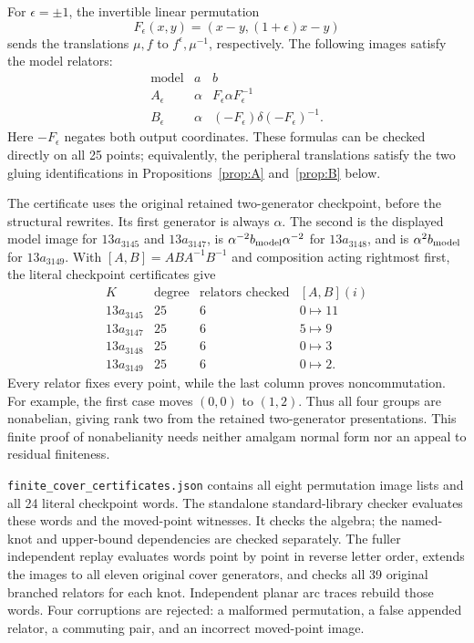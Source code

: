 \documentclass[11pt]{article}
\begin{document}
For $\epsilon=\pm1$, the invertible linear permutation
\[
 F_\epsilon(x,y)=(x-y,(1+\epsilon)x-y)
\]
sends the translations $\mu,f$ to $f^\epsilon,\mu^{-1}$,
respectively. The following images satisfy the model relators:
\[
\begin{array}{c|cc}
 \text{model}&a&b\\\hline
 A_\epsilon&\alpha&F_\epsilon\alpha F_\epsilon^{-1}\\
 B_\epsilon&\alpha&(-F_\epsilon)\delta(-F_\epsilon)^{-1}.
\end{array}
\]
Here $-F_\epsilon$ negates both output coordinates. These formulas
can be checked directly on all 25 points; equivalently, the
peripheral translations satisfy the two gluing identifications
in Propositions~\ref{prop:A} and~\ref{prop:B} below.

The certificate uses the original retained two-generator
checkpoint, before the structural rewrites. Its first generator
is always $\alpha$. The second is the displayed model image
for $13a_{3145}$ and $13a_{3147}$, is
$\alpha^{-2}b_{\rm model}\alpha^{-2}$ for $13a_{3148}$,
and is $\alpha^2b_{\rm model}$ for $13a_{3149}$.
With $[A,B]=ABA^{-1}B^{-1}$ and composition acting rightmost
first, the literal checkpoint certificates give
\[
\begin{array}{c|c|c|c}
 K&\text{degree}&\text{relators checked}&[A,B](i)\\\hline
 13a_{3145}&25&6&0\mapsto11\\
 13a_{3147}&25&6&5\mapsto9\\
 13a_{3148}&25&6&0\mapsto3\\
 13a_{3149}&25&6&0\mapsto2.
\end{array}
\]
Every relator fixes every point, while the last column proves
noncommutation. For example, the first case moves $(0,0)$ to
$(1,2)$. Thus all four groups are nonabelian, giving rank two
from the retained two-generator presentations. This finite
proof of nonabelianity needs neither amalgam normal form nor
an appeal to residual finiteness.

\texttt{finite\_cover\_certificates.json} contains all eight
permutation image lists and all 24 literal checkpoint words.
The standalone standard-library checker
 evaluates these
words and the moved-point witnesses. It checks the algebra;
the named-knot and upper-bound dependencies are checked separately.
The fuller independent replay evaluates words point by point
in reverse letter order, extends the images to all eleven
original cover generators, and checks all 39 original branched
relators for each knot. Independent planar arc traces rebuild
those words. Four corruptions are rejected: a malformed
permutation, a false appended relator, a commuting pair, and
an incorrect moved-point image.
\end{document}
